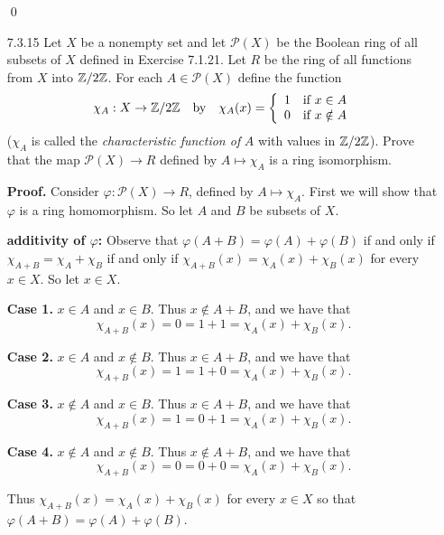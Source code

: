 \begin{enumerate}
      \qed
   \item[7.3.15]  Let $X$ be a nonempty set and let $\mathcal{P}(X)$ be the
                  Boolean ring of all subsets of $X$ defined in Exercise 7.1.21.
                  Let $R$ be the ring of all functions from $X$ into $\mathbb{Z}/2\mathbb{Z}$.
                  For each $A \in \mathcal{P}(X)$ define the function
                  $$\chi_A : X \rightarrow \mathbb{Z}/2\mathbb{Z} \quad \text{by} \quad
                    \chi_A(x) = \left\{
                       \begin{array}{ll}
                          1 & \text{if } x \in A \\
                          0 & \text{if } x \notin A
                       \end{array} \right.
                  $$
                  ($\chi_A$ is called the \textit{characteristic function of }
                  $A$ with values in $\mathbb{Z}/2\mathbb{Z}$). Prove that the map
                  $\mathcal{P}(X) \rightarrow R$ defined by $A \mapsto \chi_A$
                  is a ring isomorphism.

      \textbf{Proof.} Consider $\varphi : \mathcal{P}(X) \rightarrow R$, defined 
      by $A \mapsto \chi_A$. First we will show that $\varphi$ is a ring
      homomorphism. So let $A$ and $B$ be subsets of $X$.

      \textbf{additivity of $\varphi$:} Observe that
      $\varphi(A + B) = \varphi(A) + \varphi(B)$ if and only if
      $\chi_{A+B} = \chi_A + \chi_B$ if and only if
      $\chi_{A+B}(x) = \chi_A(x) + \chi_B(x)$ for every $x \in X$. So let
      $x \in X$.

      \textbf{Case 1.} $x \in A$ and $x \in B$. Thus $x \notin A + B$, and we
      have that
      $$\chi_{A+B}(x) = 0 = 1 + 1 = \chi_A(x) + \chi_B(x).$$

      \textbf{Case 2.} $x \in A$ and $x \notin B$. Thus $x \in A + B$, and we
      have that
      $$\chi_{A+B}(x) = 1 = 1 + 0 = \chi_A(x) + \chi_B(x).$$

      \textbf{Case 3.} $x \notin A$ and $x \in B$. Thus $x \in A + B$, and we
      have that
      $$\chi_{A+B}(x) = 1 = 0 + 1 = \chi_A(x) + \chi_B(x).$$

      \textbf{Case 4.} $x \notin A$ and $x \notin B$. Thus $x \notin A + B$, and 
      we have that
      $$\chi_{A+B}(x) = 0 = 0 + 0 = \chi_A(x) + \chi_B(x).$$

      Thus $\chi_{A+B}(x) = \chi_A(x) + \chi_B(x)$ for every $x \in X$ so that
      $\varphi(A + B) = \varphi(A) + \varphi(B)$. \\


\end{enumerate}
